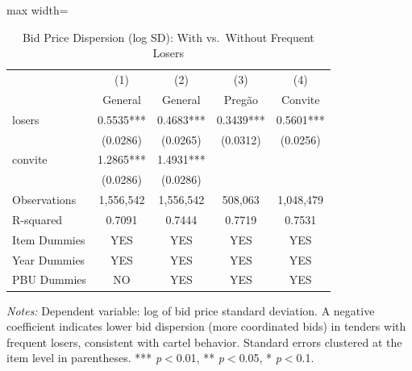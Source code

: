 \begin{table}[htbp]
\centering
\caption{Bid Price Dispersion (log SD): With vs.\ Without Frequent Losers}
\label{tab:bid_dispersion}
\begin{adjustbox}{max width=\textwidth}
\begin{threeparttable}
\small
\begin{tabular}{lcccc}
\toprule
 & (1) & (2) & (3) & (4) \\
 & General & General & Preg\~{a}o & Convite \\
\midrule
losers & 0.5535*** & 0.4683*** & 0.3439*** & 0.5601*** \\
 & (0.0286) & (0.0265) & (0.0312) & (0.0256) \\
convite & 1.2865*** & 1.4931*** &  &  \\
 & (0.0286) & (0.0286) &  &  \\
\midrule
Observations & 1,556,542 & 1,556,542 & 508,063 & 1,048,479 \\
R-squared & 0.7091 & 0.7444 & 0.7719 & 0.7531 \\
Item Dummies & YES & YES & YES & YES \\
Year Dummies & YES & YES & YES & YES \\
PBU Dummies & NO & YES & YES & YES \\
\bottomrule
\end{tabular}
\begin{tablenotes}
\small
\item \textit{Notes:} Dependent variable: log of bid price standard deviation.
A negative coefficient indicates lower bid dispersion (more coordinated bids)
in tenders with frequent losers, consistent with cartel behavior.
Standard errors clustered at the item level in parentheses.
*** \textit{p}$<$0.01, ** \textit{p}$<$0.05, * \textit{p}$<$0.1.
\end{tablenotes}
\end{threeparttable}
\end{adjustbox}
\end{table}
